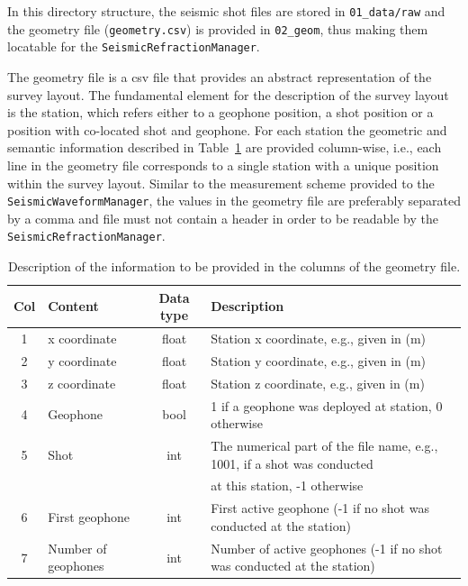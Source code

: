 \documentclass[a4paper,fleqn]{cas-sc}
\begin{document}
In this directory structure, the seismic shot files are stored in \texttt{01\_data/raw} and the geometry file (\texttt{geometry.csv}) is provided in \texttt{02\_geom}, thus making them locatable for the \texttt{SeismicRefractionManager}.

The geometry file is a csv file that provides an abstract representation of the survey layout. The fundamental element for the description of the survey layout is the station, which refers either to a geophone position, a shot position or a position with co-located shot and geophone. For each station the geometric and semantic information described in Table~\ref{tab:geometry} are provided column-wise, i.e., each line in the geometry file corresponds to a single station with a unique position within the survey layout. Similar to the measurement scheme provided to the \texttt{SeismicWaveformManager}, the values in the geometry file are preferably separated by a comma and file must not contain a header in order to be readable by the \texttt{SeismicRefractionManager}.
\begin{table}[]
    \caption{Description of the information to be provided in the columns of the geometry file.}
    \centering
    \begin{tabular}{clcl}
        \toprule
        Col & \textbf{Content} & \textbf{Data type} & \textbf{Description} \\
        \midrule
        1 & x coordinate & float & Station x coordinate, e.g., given in (m) \\ 
        2 & y coordinate & float & Station y coordinate, e.g., given in (m) \\ 
        3 & z coordinate & float & Station z coordinate, e.g., given in (m) \\ 
        4 & Geophone & bool & 1 if a geophone was deployed at station, 0 otherwise \\ 
        5 & Shot & int & The numerical part of the file name, e.g., 1001, if a shot was conducted \\
          & & & at this station, -1 otherwise \\ 
        6 & First geophone & int & First active geophone (-1 if no shot was conducted at the station) \\ 
        7 & Number of geophones & int & Number of active geophones (-1 if no shot was conducted at the station) \\
        \bottomrule
    \end{tabular}
    \label{tab:geometry}
\end{table}
\end{document}
